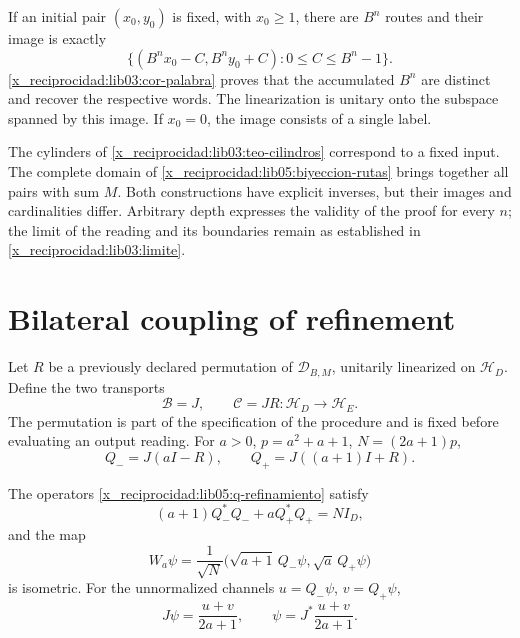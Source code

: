 If an initial pair \((x_0,y_0)\) is fixed, with \(x_0\geq1\),
there are \(B^n\) routes and their image is exactly
\begin{equation}
 \bigl\{(B^nx_0-C,B^ny_0+C):0\leq C\leq B^n-1\bigr\}.
 \label{x_reciprocidad:lib05:imagen-fija}
\end{equation}
\cref{x_reciprocidad:lib03:cor-palabra} proves that the accumulated \(B^n\)
are distinct and recover the respective words. The
linearization is unitary onto the subspace spanned by this
image. If \(x_0=0\), the image consists of a single label.

The cylinders of \cref{x_reciprocidad:lib03:teo-cilindros} correspond to a
fixed input. The complete domain of
\eqref{x_reciprocidad:lib05:biyeccion-rutas} brings together all pairs with sum \(M\).
Both constructions have explicit inverses, but their images
and cardinalities differ. Arbitrary depth expresses the
validity of the proof for every \(n\); the limit of the reading and
its boundaries remain as established in
\cref{x_reciprocidad:lib03:limite}.

\section{Bilateral coupling of refinement}
\label{x_reciprocidad:lib05:bilateral}

Let \(R\) be a previously declared permutation of
\(\mathcal D_{B,M}\), unitarily linearized on
\(\mathscr H_D\). Define the two transports
\begin{equation}
 \mathcal B=J,\qquad \mathcal C=JR:
            \mathscr H_D\longrightarrow\mathscr H_E.
 \label{x_reciprocidad:lib05:dos-transportes}
\end{equation}
The permutation is part of the specification of the procedure
and is fixed before evaluating an output reading.
For \(a>0\), \(p=a^2+a+1\), \(N=(2a+1)p\),
\begin{equation}
 Q_-=J(aI-R),\qquad Q_+=J((a+1)I+R).
 \label{x_reciprocidad:lib05:q-refinamiento}
\end{equation}

\begin{proposition}
\label{x_reciprocidad:lib05:prop-bilateral}
The operators \eqref{x_reciprocidad:lib05:q-refinamiento} satisfy
\begin{equation}
 (a+1)Q_-^*Q_-+aQ_+^*Q_+=NI_D,
 \label{x_reciprocidad:lib05:balance}
\end{equation}
and the map
\begin{equation}
 W_a\psi=\frac1{\sqrt N}
    \bigl(\sqrt{a+1}\,Q_-\psi,\sqrt a\,Q_+\psi\bigr)
 \label{x_reciprocidad:lib05:w}
\end{equation}
is isometric. For the unnormalized channels
\(u=Q_-\psi\), \(v=Q_+\psi\),
\begin{equation}
 J\psi=\frac{u+v}{2a+1},\qquad
 \psi=J^*\frac{u+v}{2a+1}.
 \label{x_reciprocidad:lib05:inversa-bilateral}
\end{equation}
\end{proposition}

